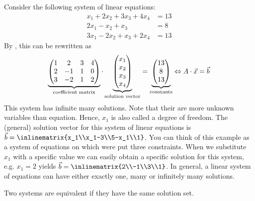 \begin{exm}\label{exm-system-of-linear-equations}
	Consider the following system of linear equations:
	\begin{align*}
		x_1 + 2x_2 + 3x_3 + 4x_4  & = 13 \\
		2x_1 -  x_2 +  x_3        & = 8  \\
		3x_1 - 2x_2 +  x_3 + 2x_4 & = 13
	\end{align*}
	By , this can be rewritten as
	\begin{equation*}
		\underbrace{
			\begin{pmatrix}
				1 & 2  & 3 & 4 \\
				2 & -1 & 1 & 0 \\
				3 & -2 & 1 & 2
			\end{pmatrix}
		}_{\textnormal{coefficient matrix}} \cdot
		\underbrace{
			\begin{pmatrix}
				x_1 \\
				x_2 \\
				x_3 \\
				x_4
			\end{pmatrix}
		}_{\textnormal{solution vector}} =
		\underbrace{
			\begin{pmatrix}
				13 \\
				8  \\
				13
			\end{pmatrix}
		}_{\textnormal{constants}} \Leftrightarrow A \cdot \vec{x} = \vec{b}
	\end{equation*}
	This system has infinite many solutions. Note that their are more unknown
	variables than equation. Hence, $x_1$ is also called a degree of freedom.
	The (general) solution vector for this system of linear equations is
	$\vec{b}=\inlinematrix{x_1\\x_1-3\\5-x_1\\1}$.
	You can think of this example as a system of equations on which were put three
	constraints. When we substitute $x_1$ with a specific value we can easily
	obtain a specific solution for this system, e.g. $x_1=2$ yields
	$\vec{b}=\inlinematrix{2\\-1\\3\\1}$. In
	general, a linear system of equations can have either exactly one, many or
	infinitely many solutions.
\end{exm}

\begin{definition}\label{def-equivalent-systems}
	Two systems are equivalent if they have the same solution set.
\end{definition}

